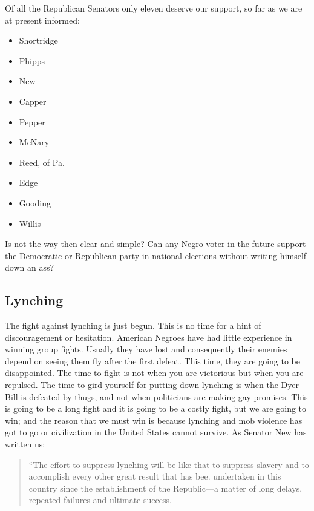 \documentclass[letterpaper,10pt,english]{jupyterBook}
\begin{document}
\sphinxAtStartPar
Of all the Republican Senators only eleven deserve our support, so far as we are at present informed:
\begin{itemize}
\item {} 
\sphinxAtStartPar
Shortridge

\item {} 
\sphinxAtStartPar
Phipps

\item {} 
\sphinxAtStartPar
New

\item {} 
\sphinxAtStartPar
Capper

\item {} 
\sphinxAtStartPar
Pepper

\item {} 
\sphinxAtStartPar
McNary

\item {} 
\sphinxAtStartPar
Reed, of Pa.

\item {} 
\sphinxAtStartPar
Edge

\item {} 
\sphinxAtStartPar
Gooding

\item {} 
\sphinxAtStartPar
Willis

\end{itemize}

\sphinxAtStartPar
Is not the way then clear and simple? Can any Negro voter in the future support the Democratic or Republican party in national elections without writing himself down an ass?


\subsection{Lynching}
\label{\detokenize{Volumes/24/03/intentions:lynching}}
\sphinxAtStartPar
The fight against lynching is just begun. This is no time for a hint of discouragement or hesitation. American Negroes have had little experience in winning group fights. Usually they have lost and consequently their enemies depend on seeing them fly after the first defeat. This time, they are going to be disappointed. The time to fight is not when you are victorious but when you are repulsed. The time to gird yourself for putting down lynching is when the Dyer Bill is defeated by thugs, and not when politicians are making gay promises. This is going to be a long fight and it is going to be a costly fight, but we are going to win; and the reason that we must win is because lynching and mob violence has got to go or civilization in the United States cannot survive. As Senator New has written us:
\begin{quote}

\sphinxAtStartPar
“The effort to suppress lynching will be like that to suppress slavery and to accomplish every other great result that has bee. undertaken in this country since the establishment of the Republic—a matter of long delays, repeated failures and ultimate success.
\end{quote}
\end{document}
